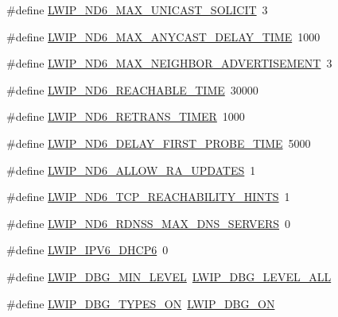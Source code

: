 \begin{DoxyCompactItemize}
\item 
\#define \hyperlink{group__lwip__opts__nd6_gafa6f4c2d2c259ab0895fa03a6f08c691}{L\+W\+I\+P\+\_\+\+N\+D6\+\_\+\+M\+A\+X\+\_\+\+U\+N\+I\+C\+A\+S\+T\+\_\+\+S\+O\+L\+I\+C\+IT}~3
\item 
\#define \hyperlink{group__lwip__opts__nd6_ga960b8973df083fad53ae0eaa79f8c4df}{L\+W\+I\+P\+\_\+\+N\+D6\+\_\+\+M\+A\+X\+\_\+\+A\+N\+Y\+C\+A\+S\+T\+\_\+\+D\+E\+L\+A\+Y\+\_\+\+T\+I\+ME}~1000
\item 
\#define \hyperlink{group__lwip__opts__nd6_ga86ab0cac87cdc7aeff09384ddbaaba2a}{L\+W\+I\+P\+\_\+\+N\+D6\+\_\+\+M\+A\+X\+\_\+\+N\+E\+I\+G\+H\+B\+O\+R\+\_\+\+A\+D\+V\+E\+R\+T\+I\+S\+E\+M\+E\+NT}~3
\item 
\#define \hyperlink{group__lwip__opts__nd6_ga269db9d61cdfc2fd3bc7b12c56261c74}{L\+W\+I\+P\+\_\+\+N\+D6\+\_\+\+R\+E\+A\+C\+H\+A\+B\+L\+E\+\_\+\+T\+I\+ME}~30000
\item 
\#define \hyperlink{group__lwip__opts__nd6_ga461abcbeef1d236d1f3201827dd28ad9}{L\+W\+I\+P\+\_\+\+N\+D6\+\_\+\+R\+E\+T\+R\+A\+N\+S\+\_\+\+T\+I\+M\+ER}~1000
\item 
\#define \hyperlink{group__lwip__opts__nd6_ga315bd6d4a9d185766dfc3253cd9d7715}{L\+W\+I\+P\+\_\+\+N\+D6\+\_\+\+D\+E\+L\+A\+Y\+\_\+\+F\+I\+R\+S\+T\+\_\+\+P\+R\+O\+B\+E\+\_\+\+T\+I\+ME}~5000
\item 
\#define \hyperlink{group__lwip__opts__nd6_gad35d10353ac7c7d2c8d4b83788cdc6d9}{L\+W\+I\+P\+\_\+\+N\+D6\+\_\+\+A\+L\+L\+O\+W\+\_\+\+R\+A\+\_\+\+U\+P\+D\+A\+T\+ES}~1
\item 
\#define \hyperlink{group__lwip__opts__nd6_ga9d7cb6fd447ef0f6726f565e2c7509c4}{L\+W\+I\+P\+\_\+\+N\+D6\+\_\+\+T\+C\+P\+\_\+\+R\+E\+A\+C\+H\+A\+B\+I\+L\+I\+T\+Y\+\_\+\+H\+I\+N\+TS}~1
\item 
\#define \hyperlink{group__lwip__opts__nd6_gaea4d829c0b52cc6cc28925eee89a7429}{L\+W\+I\+P\+\_\+\+N\+D6\+\_\+\+R\+D\+N\+S\+S\+\_\+\+M\+A\+X\+\_\+\+D\+N\+S\+\_\+\+S\+E\+R\+V\+E\+RS}~0
\item 
\#define \hyperlink{openmote-cc2538_2lwip_2src_2include_2lwip_2opt_8h_a1ba67b6665026ec0c688dc4b0df047a6}{L\+W\+I\+P\+\_\+\+I\+P\+V6\+\_\+\+D\+H\+C\+P6}~0
\item 
\#define \hyperlink{group__lwip__opts__debugmsg_ga2043f599515774f8e571ba185dbcb9e7}{L\+W\+I\+P\+\_\+\+D\+B\+G\+\_\+\+M\+I\+N\+\_\+\+L\+E\+V\+EL}~\hyperlink{group__debugging__levels_ga8ebaeb006b43f55897f3196b3617dc87}{L\+W\+I\+P\+\_\+\+D\+B\+G\+\_\+\+L\+E\+V\+E\+L\+\_\+\+A\+LL}
\item 
\#define \hyperlink{group__lwip__opts__debugmsg_gac095d0e53f5eb5b326b2cccfd071d93d}{L\+W\+I\+P\+\_\+\+D\+B\+G\+\_\+\+T\+Y\+P\+E\+S\+\_\+\+ON}~\hyperlink{group__debugging__levels_ga9e31b7cbbc8f46af8e62b548079acd4e}{L\+W\+I\+P\+\_\+\+D\+B\+G\+\_\+\+ON}

\end{DoxyCompactItemize}
